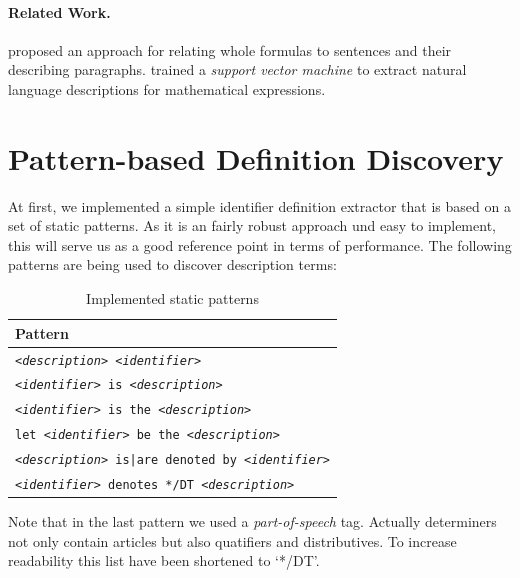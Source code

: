 \documentclass[runningheads]{llncs}
\begin{document}
\paragraph{Related Work.}

\citeauthor{Quoc2010} \cite{Quoc2010} proposed an approach for
relating whole formulas to sentences and their describing paragraphs.
\citeauthor{Yokoi} \cite{Yokoi} trained a \emph{support vector machine} to extract
natural language descriptions for mathematical expressions.

\section{Pattern-based Definition Discovery}

At first, we implemented a simple identifier definition extractor that is
based on a set of static patterns. As it is an fairly robust approach und easy
to implement, this will serve us as a good reference point in terms of
performance. The following patterns are being used to discover description
terms:

\begin{table}
\vspace{-5pt}
	\begin{center}
		\begin{tabular}{| p{9.3cm} |}
			\hline
			Pattern \\
			\hline
			\texttt{\emph{<description>} \emph{<identifier>}} \\
			\texttt{\emph{<identifier>} is \emph{<description>}} \\
			\texttt{\emph{<identifier>} is the \emph{<description>}} \\
			\texttt{let \emph{<identifier>} be the \emph{<description>}} \\
			\texttt{\emph{<description>} is|are denoted by \emph{<identifier>}} \\
			\texttt{\emph{<identifier>} denotes */DT \emph{<description>}} \\
			\hline
		\end{tabular}
	\end{center}
\caption{Implemented static patterns}
\vspace{-5pt}
\end{table}

Note that in the last pattern we used a \emph{part-of-speech} tag. Actually
determiners not only contain articles but also quatifiers and distributives.
To increase readability this list have been shortened to `*/DT'.
\end{document}
